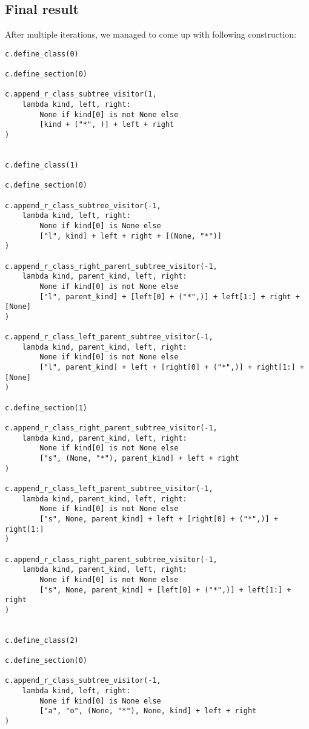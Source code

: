 \documentclass[final]{article}
\theoremstyle{definition}
\theoremstyle{remark}
\begin{document}
\subsection{Final result}%
\label{sub:final_result}

After multiple iterations, we managed to come up with following construction:

\begin{lstlisting}
c.define_class(0)

c.define_section(0)

c.append_r_class_subtree_visitor(1,
    lambda kind, left, right:
        None if kind[0] is not None else
        [kind + ("*", )] + left + right
)


c.define_class(1)

c.define_section(0)

c.append_r_class_subtree_visitor(-1,
    lambda kind, left, right:
        None if kind[0] is None else
        ["l", kind] + left + right + [(None, "*")]
)

c.append_r_class_right_parent_subtree_visitor(-1,
    lambda kind, parent_kind, left, right:
        None if kind[0] is not None else
        ["l", parent_kind] + [left[0] + ("*",)] + left[1:] + right + [None]
)

c.append_r_class_left_parent_subtree_visitor(-1,
    lambda kind, parent_kind, left, right:
        None if kind[0] is not None else
        ["l", parent_kind] + left + [right[0] + ("*",)] + right[1:] + [None]
)

c.define_section(1)

c.append_r_class_right_parent_subtree_visitor(-1,
    lambda kind, parent_kind, left, right:
        None if kind[0] is not None else
        ["s", (None, "*"), parent_kind] + left + right
)

c.append_r_class_left_parent_subtree_visitor(-1,
    lambda kind, parent_kind, left, right:
        None if kind[0] is not None else
        ["s", None, parent_kind] + left + [right[0] + ("*",)] + right[1:]
)

c.append_r_class_right_parent_subtree_visitor(-1,
    lambda kind, parent_kind, left, right:
        None if kind[0] is not None else
        ["s", None, parent_kind] + [left[0] + ("*",)] + left[1:] + right
)


c.define_class(2)

c.define_section(0)

c.append_r_class_subtree_visitor(-1,
    lambda kind, left, right:
        None if kind[0] is None else
        ["a", "o", (None, "*"), None, kind] + left + right
)


\end{lstlisting}
\end{document}
